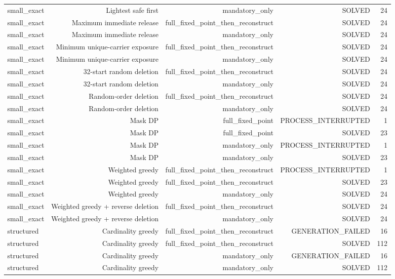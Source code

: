 {\begin{longtable}{lrrrr}
small\_exact & Lightest safe first & mandatory\_only & SOLVED & 24 \\
small\_exact & Maximum immediate release & full\_fixed\_point\_then\_reconstruct & SOLVED & 24 \\
small\_exact & Maximum immediate release & mandatory\_only & SOLVED & 24 \\
small\_exact & Minimum unique-carrier exposure & full\_fixed\_point\_then\_reconstruct & SOLVED & 24 \\
small\_exact & Minimum unique-carrier exposure & mandatory\_only & SOLVED & 24 \\
small\_exact & 32-start random deletion & full\_fixed\_point\_then\_reconstruct & SOLVED & 24 \\
small\_exact & 32-start random deletion & mandatory\_only & SOLVED & 24 \\
small\_exact & Random-order deletion & full\_fixed\_point\_then\_reconstruct & SOLVED & 24 \\
small\_exact & Random-order deletion & mandatory\_only & SOLVED & 24 \\
small\_exact & Mask DP & full\_fixed\_point & PROCESS\_INTERRUPTED & 1 \\
small\_exact & Mask DP & full\_fixed\_point & SOLVED & 23 \\
small\_exact & Mask DP & mandatory\_only & PROCESS\_INTERRUPTED & 1 \\
small\_exact & Mask DP & mandatory\_only & SOLVED & 23 \\
small\_exact & Weighted greedy & full\_fixed\_point\_then\_reconstruct & PROCESS\_INTERRUPTED & 1 \\
small\_exact & Weighted greedy & full\_fixed\_point\_then\_reconstruct & SOLVED & 23 \\
small\_exact & Weighted greedy & mandatory\_only & SOLVED & 24 \\
small\_exact & Weighted greedy + reverse deletion & full\_fixed\_point\_then\_reconstruct & SOLVED & 24 \\
small\_exact & Weighted greedy + reverse deletion & mandatory\_only & SOLVED & 24 \\
structured & Cardinality greedy & full\_fixed\_point\_then\_reconstruct & GENERATION\_FAILED & 16 \\
structured & Cardinality greedy & full\_fixed\_point\_then\_reconstruct & SOLVED & 112 \\
structured & Cardinality greedy & mandatory\_only & GENERATION\_FAILED & 16 \\
structured & Cardinality greedy & mandatory\_only & SOLVED & 112 \\

\end{longtable}}
